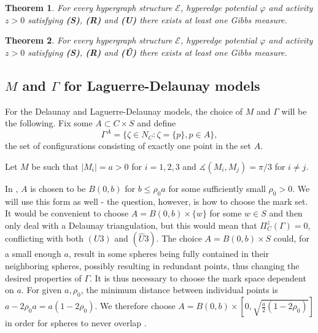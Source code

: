 \documentclass[12pt,a4paper]{article}
\newtheorem{theorem}{Theorem}
\theoremstyle{definition}
\theoremstyle{remark}
\theoremstyle{theorem}
\begin{document}

\begin{theorem}
	For every hypergraph structure $\mathcal E$, hyperedge potential $\varphi$ and activity $z>0$ satisfying \textbf{(S)}, \textbf{(R)} and \textbf{(U)} there exists at least one Gibbs measure.
\end{theorem}

\begin{theorem}
	For every hypergraph structure $\mathcal E$, hyperedge potential $\varphi$ and activity $z>0$ satisfying \textbf{(S)}, \textbf{(R)} and \textbf{(\^{U})} there exists at least one Gibbs measure.
\end{theorem}







\subsection{$M$ and $\Gamma$ for Laguerre-Delaunay models}\label{sec:MGamma}
For the Delaunay and Laguerre-Delaunay models, the choice of $M$ and $\Gamma$ will be the following. Fix some $A \subset C\times S$ and define
$$\Gamma^A = \{\zeta \in N_C: \zeta = \{p\}, p \in A\},$$
the set of configurations consisting of exactly one point in the set $A$.

Let $M$ be such that $|M_i| = a > 0$ for $i=1,2,3$ and $\measuredangle(M_i,M_j) = \pi / 3$ for $i\neq j$.

In \cite{DDG12}, $A$ is chosen to be $B(0,b)$ for $b\leq \rho_0 a$ for some  sufficiently small $\rho_0 >0$. We will use this form as well - the question, however, is how to choose the mark set. It would be convenient to choose $A=B(0,b)\times\{w\}$ for some $w\in S$ and then only deal with a Delaunay triangulation, but this  would mean that $\Pi^z_C(\Gamma) = 0$, conflicting with both $(U3)$ and $(\hat U3)$. The choice $A=B(0,b)\times S$ could, for a small enough $a$, result in some spheres being fully contained in their neighboring spheres, possibly resulting in redundant points, thus changing the desired properties of $\Gamma$. It is thus necessary to choose the mark space dependent on $a$. For given $a,\rho_0$, the minimum distance between individual points is $a-2\rho_0 a = a(1-2\rho_0)$. We therefore choose $A = B(0,b)\times [0, \sqrt{\frac a2(1-2\rho_0)}]$ in order for spheres to never overlap . 
\end{document}
